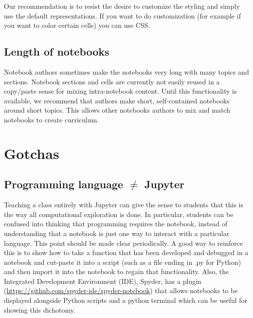 \documentclass[]{book}
\begin{document}
Our recommendation is to resist the desire to customize the styling
and simply use the default representations. If you want to do
customization (for example if you want to color certain cells) you can
use CSS.

\hypertarget{length-of-notebooks}{%
\subsection{Length of notebooks}\label{length-of-notebooks}}

Notebook authors sometimes make the notebooks very long with many
topics and sections. Notebook sections and cells are currently not
easily reused in a copy/paste sense for mixing intra-notebook
content. Until this functionality is available, we recommend that
authors make short, self-contained notebooks around short topics. This
allows other notebooks authors to mix and match notebooks to create
curriculum.

\hypertarget{gotchas}{%
\section{Gotchas}\label{gotchas}}

\hypertarget{programming-language-neq-jupyter}{%
\subsection{\texorpdfstring{Programming language \(\neq\) Jupyter}{Programming language \textbackslash neq Jupyter}}\label{programming-language-neq-jupyter}}

Teaching a class entirely with Jupyter can give the sense to students
that this is the way all computational exploration is done. In
particular, students can be confused into thinking that programming
requires the notebook, instead of understanding that a notebook is
just one way to interact with a particular language. This point should
be made clear periodically. A good way to reinforce this is to show
how to take a function that has been developed and debugged in a
notebook and cut-paste it into a script (such as a file ending in .py
for Python) and then import it into the notebook to regain that
functionality. Also, the Integrated Development Environment (IDE),
Spyder, has a plugin
(\url{https://github.com/spyder-ide/spyder-notebook})
that allows notebooks to be displayed alongside Python scripts and a
python terminal which can be useful for showing this dichotomy.
\end{document}
